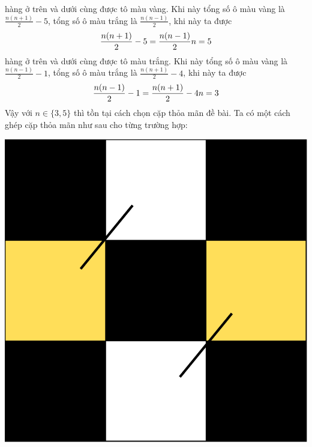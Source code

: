 \documentclass[11pt]{scrartcl}
\begin{document}
\begin{itemize}[label=, leftmargin=0em, itemsep=0.5em]
\begin{sol}
         hàng ở trên và dưới cùng được tô màu vàng.  Khi này tổng số ô màu vàng là $\frac{n(n + 1)}{2} - 5$, tổng số ô màu trắng là $\frac{n(n - 1)}{2}$, khi này ta được 
        \[
            \frac{n(n + 1)}{2} - 5 = \frac{n(n - 1)}{2} \lra n = 5
        \]
         hàng ở trên và dưới cùng được tô màu trắng. Khi này tổng số ô màu vàng là $\frac{n(n - 1)}{2} - 1$, tổng số ô màu trắng là $\frac{n(n + 1)}{2} - 4$, khi này ta được 
        \[
            \frac{n(n - 1)}{2} - 1 = \frac{n(n + 1)}{2} - 4 \ra n = 3
        \]
        Vậy với $n \in \{3,5\}$ thì tồn tại cách chọn cặp thỏa mãn đề bài. Ta có một cách ghép cặp thỏa mãn như sau cho từng trường hợp:
        \begin{center}
            \includegraphics[scale=0.2]{Image/P1.3.pdf}
            \hspace{1cm}

\end{center}
\end{sol}
\end{itemize}
\end{document}
